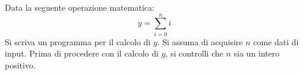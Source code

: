 \begin{Exercise}[label={ex:somma}]
  	Data la seguente operazione matematica:
  	$$ y = \sum^{n}_{i=0} i$$
    Si scriva un programma per il calcolo di $y$. Si assuma di acquisire $n$ come dati di input. Prima di procedere con il calcolo di $y$, si controlli che $n$ sia un intero positivo.
\end{Exercise}

\begin{Answer}[ref={ex:somma}]
  
\end{Answer}
